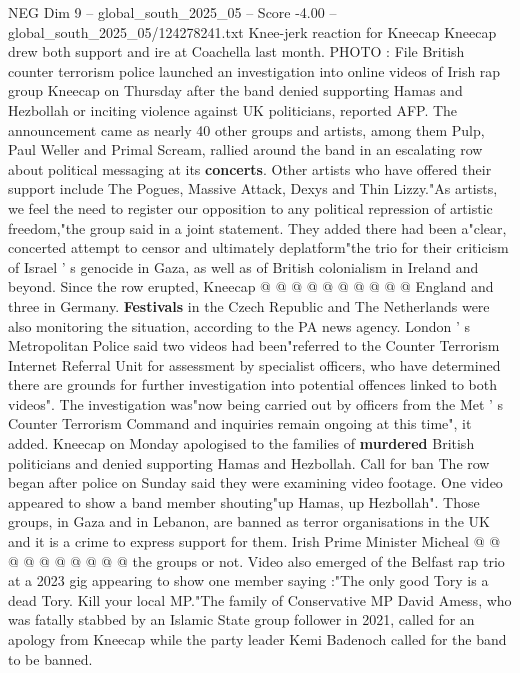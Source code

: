 \begin{textsample}{NEG Dim 9 – global\_south\_2025\_05 – Score -4.00 – global\_south\_2025\_05/124278241.txt}  \label{ex:f9_neg_229}
Knee-jerk reaction for Kneecap Kneecap drew both support and ire at Coachella last month.
PHOTO : File British counter terrorism police launched an investigation into online videos of Irish rap group Kneecap on Thursday after the band denied supporting Hamas and Hezbollah or inciting violence against UK politicians, reported AFP.
The announcement came as nearly 40 other groups and artists, among them Pulp, Paul Weller and Primal Scream, rallied around the band in an escalating row about political messaging at its \textbf{concerts}.
Other artists who have offered their support include The Pogues, Massive Attack, Dexys and Thin Lizzy."As artists, we feel the need to register our opposition to any political repression of artistic freedom,"the group said in a joint statement.
They added there had been a"clear, concerted attempt to censor and ultimately deplatform"the trio for their criticism of Israel ' s genocide in Gaza, as well as of British colonialism in Ireland and beyond.
Since the row erupted, Kneecap @ @ @ @ @ @ @ @ @ @ England and three in Germany. \textbf{Festivals} in the Czech Republic and The Netherlands were also monitoring the situation, according to the PA news agency.
London ' s Metropolitan Police said two videos had been"referred to the Counter Terrorism Internet Referral Unit for assessment by specialist officers, who have determined there are grounds for further investigation into potential offences linked to both videos".
The investigation was"now being carried out by officers from the Met ' s Counter Terrorism Command and inquiries remain ongoing at this time", it added.
Kneecap on Monday apologised to the families of \textbf{murdered} British politicians and denied supporting Hamas and Hezbollah.
Call for ban The row began after police on Sunday said they were examining video footage.
One video appeared to show a band member shouting"up Hamas, up Hezbollah".
Those groups, in Gaza and in Lebanon, are banned as terror organisations in the UK and it is a crime to express support for them.
Irish Prime Minister Micheal @ @ @ @ @ @ @ @ @ @ the groups or not.
Video also emerged of the Belfast rap trio at a 2023 gig appearing to show one member saying :"The only good Tory is a dead Tory.
Kill your local MP."The family of Conservative MP David Amess, who was fatally stabbed by an Islamic State group follower in 2021, called for an apology from Kneecap while the party leader Kemi Badenoch called for the band to be banned.

\end{textsample}
